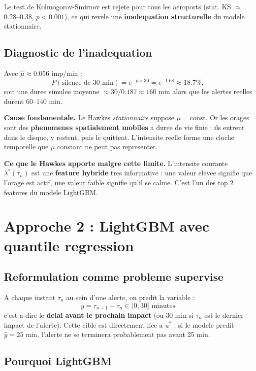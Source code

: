 \documentclass[a4paper,11pt]{article}
\begin{document}
Le test de Kolmogorov-Smirnov est rejete pour tous les aeroports
(stat. KS $\approx$ 0.28--0.38, $p < 0.001$), ce qui revele une
\textbf{inadequation structurelle} du modele stationnaire.

\subsection{Diagnostic de l'inadequation}

Avec $\hat\mu \approx 0.056$ imp/min :
\[
P(\text{silence de 30 min}) = e^{-\hat\mu \times 30} = e^{-1.68} \approx 18.7\%,
\]
soit une duree simulee moyenne $\approx 30/0.187 \approx 160$ min alors que les
alertes reelles durent 60--140 min.

\textbf{Cause fondamentale.} Le Hawkes \emph{stationnaire} suppose $\mu =
\text{const}$. Or les orages sont des \textbf{phenomenes spatialement mobiles}
a duree de vie finie : ils entrent dans le disque, y restent, puis le quittent.
L'intensite reelle forme une cloche temporelle que $\mu$ constant ne peut pas
representer.

\textbf{Ce que le Hawkes apporte malgre cette limite.} L'intensite courante
$\lambda^*(\tau_n)$ est une \textbf{feature hybride} tres informative : une
valeur elevee signifie que l'orage est actif, une valeur faible signifie qu'il
se calme. C'est l'un des top 2 features du modele LightGBM.

\section{Approche 2 : LightGBM avec quantile regression}

\subsection{Reformulation comme probleme supervise}

A chaque instant $\tau_n$ au sein d'une alerte, on predit la variable :
\[
y = \tau_{n+1} - \tau_n \in (0, 30] \text{ minutes}
\]
c'est-a-dire le \textbf{delai avant le prochain impact} (ou 30 min si $\tau_n$
est le dernier impact de l'alerte). Cette cible est directement liee a $u^*$ :
si le modele predit $\hat{y} = 25$ min, l'alerte ne se terminera probablement
pas avant 25 min.

\subsection{Pourquoi LightGBM}
\end{document}
